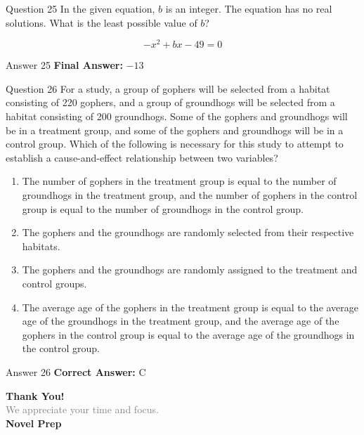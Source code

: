 \documentclass{beamer}
\begin{document}
\begin{frame}{Question 25}
\small
In the given equation, $b$ is an integer. The equation has no real solutions.  
What is the least possible value of $b$?

\[
-x^2 + bx - 49 = 0
\]
\end{frame}
\begin{frame}{Answer 25}
\small
\textbf{Final Answer:} $\boxed{-13}$
\end{frame}

\begin{frame}{Question 26}
\small
For a study, a group of gophers will be selected from a habitat consisting of 220 gophers, and a group of groundhogs will be selected from a habitat consisting of 200 groundhogs. Some of the gophers and groundhogs will be in a treatment group, and some of the gophers and groundhogs will be in a control group. Which of the following is necessary for this study to attempt to establish a cause-and-effect relationship between two variables?
\vspace{0.35cm}
\begin{enumerate}
    \item[A.] The number of gophers in the treatment group is equal to the number of groundhogs in the treatment group, and the number of gophers in the control group is equal to the number of groundhogs in the control group.
    \item[B.] The gophers and the groundhogs are randomly selected from their respective habitats.
    \item[C.] The gophers and the groundhogs are randomly assigned to the treatment and control groups.
    \item[D.] The average age of the gophers in the treatment group is equal to the average age of the groundhogs in the treatment group, and the average age of the gophers in the control group is equal to the average age of the groundhogs in the control group.
\end{enumerate}
\end{frame}
\begin{frame}{Answer 26}
\small
\textbf{Correct Answer:} C
\end{frame}

\begin{frame}{}
    \centering
    \vspace{5em}
    {\Huge \textbf{\textcolor{novelPurple}{Thank You!}}} \\[1em]
    {\large \textcolor{gray}{We appreciate your time and focus.}} \\[3em]
    {\LARGE \textbf{\textcolor{novelPurple}{\textsf{Novel Prep}}}}
    \vfill
\end{frame}
\end{document}
